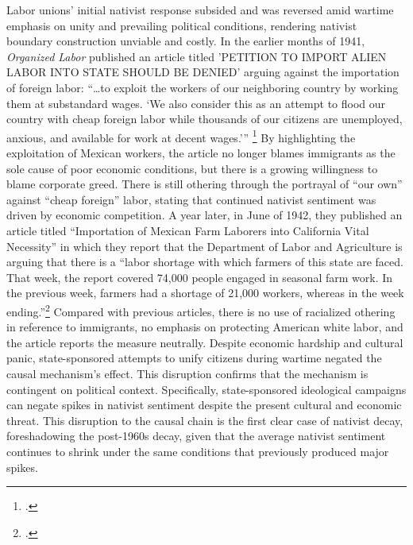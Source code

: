 \documentclass[12pt,a4paper]{article}
\begin{document}
Labor unions' initial nativist response subsided and was reversed amid wartime emphasis on unity and prevailing political conditions, rendering nativist boundary construction unviable and costly. In the earlier months of 1941, \textit{Organized Labor} published an article titled 'PETITION TO IMPORT ALIEN LABOR INTO STATE SHOULD BE DENIED' arguing against the importation of foreign labor: ``\ldots to exploit the workers of our neighboring country by working them at substandard wages. `We also consider this as an attempt to flood our country with cheap foreign labor while thousands of our citizens are unemployed, anxious, and available for work at decent wages.''' \footcite{noauthor_petition_1941} By highlighting the exploitation of Mexican workers, the article no longer blames immigrants as the sole cause of poor economic conditions, but there is a growing willingness to blame corporate greed. There is still othering through the portrayal of ``our own'' against ``cheap foreign'' labor, stating that continued nativist sentiment was driven by economic competition. A year later, in June of 1942, they published an article titled ``Importation of Mexican Farm Laborers into California Vital Necessity'' in which they report that the Department of Labor and Agriculture is arguing that there is a ``labor shortage with which farmers of this state are faced. That week, the report covered 74,000 people engaged in seasonal farm work. In the previous week, farmers had a shortage of 21,000 workers, whereas in the week ending.''\footcite{noauthor_importation_1942} Compared with previous articles, there is no use of racialized othering in reference to immigrants, no emphasis on protecting American white labor, and the article reports the measure neutrally. Despite economic hardship and cultural panic, state-sponsored attempts to unify citizens during wartime negated the causal mechanism's effect. This disruption confirms that the mechanism is contingent on political context. Specifically, state-sponsored ideological campaigns can negate spikes in nativist sentiment despite the present cultural and economic threat. This disruption to the causal chain is the first clear case of nativist decay, foreshadowing the post-1960s decay, given that the average nativist sentiment continues to shrink under the same conditions that previously produced major spikes. 
\end{document}
